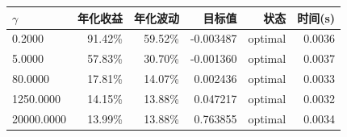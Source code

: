 \begin{center}
\small
\begin{tabular}{lrrrrr}
\toprule
$\gamma$ & 年化收益 & 年化波动 & 目标值 & 状态 & 时间(s) \\
\midrule
0.2000 & 91.42\% & 59.52\% & -0.003487 & optimal & 0.0036 \\
5.0000 & 57.83\% & 30.70\% & -0.001360 & optimal & 0.0037 \\
80.0000 & 17.81\% & 14.07\% & 0.002436 & optimal & 0.0033 \\
1250.0000 & 14.15\% & 13.88\% & 0.047217 & optimal & 0.0032 \\
20000.0000 & 13.99\% & 13.88\% & 0.763855 & optimal & 0.0034 \\
\bottomrule
\end{tabular}
\end{center}